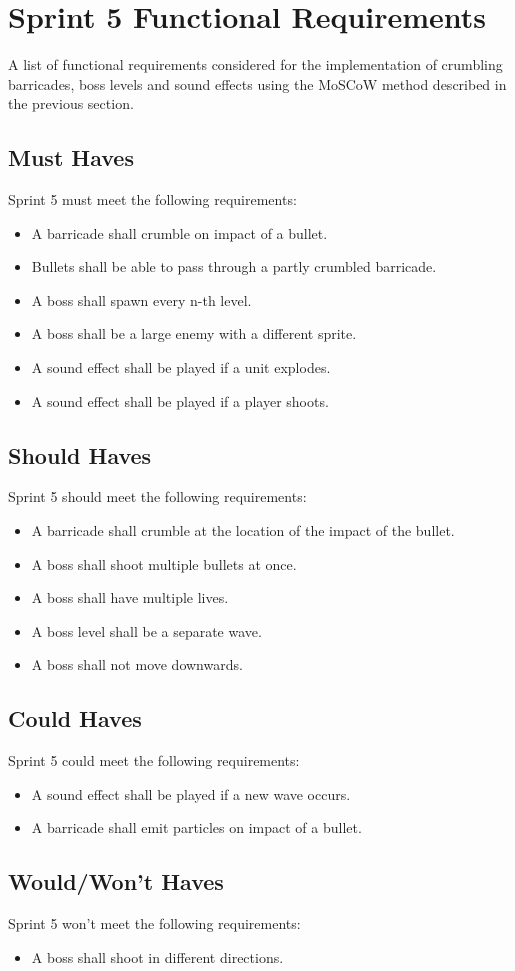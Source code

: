 \section{Sprint 5 Functional Requirements}

A list of functional requirements considered for the implementation of crumbling barricades, boss levels and sound effects using the MoSCoW method described in the previous section.

\subsection{Must Haves}
Sprint 5 must meet the following requirements:
\begin{itemize}
	\item A barricade shall crumble on impact of a bullet.
	\item Bullets shall be able to pass through a partly crumbled barricade. 
	\item A boss shall spawn every n-th level.
	\item A boss shall be a large enemy with a different sprite.
	\item A sound effect shall be played if a unit explodes.
	\item A sound effect shall be played if a player shoots.
\end{itemize}

\subsection{Should Haves}
Sprint 5 should meet the following requirements:
\begin{itemize}
	\item A barricade shall crumble at the location of the impact of the bullet.
	\item A boss shall shoot multiple bullets at once.
	\item A boss shall have multiple lives.
	\item A boss level shall be a separate wave.
	\item A boss shall not move downwards.
\end{itemize}

\subsection{Could Haves}
Sprint 5 could meet the following requirements:
\begin{itemize}
	\item A sound effect shall be played if a new wave occurs.
	\item A barricade shall emit particles on impact of a bullet.
\end{itemize}

\subsection{Would/Won't Haves}
Sprint 5 won't meet the following requirements:
\begin{itemize}
	\item A boss shall shoot in different directions.
\end{itemize}
